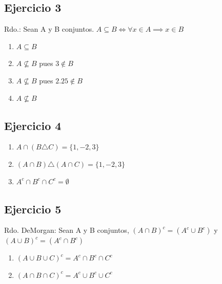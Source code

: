 \subsection{Ejercicio 3}
Rdo.: Sean A y B conjuntos. $ A \subseteq B \iff \forall x \in A \implies x \in B$
\begin{enumerate}[label=(\alph*)]
    \item $A \subseteq B$
    \item $A \not \subseteq B$ pues $3 \not \in B$
    \item $A \not \subseteq B$ pues $2.25 \not \in B$
    \item $A \not \subseteq B$
\end{enumerate}

\subsection{Ejercicio 4}
\begin{enumerate}[label=(\alph*)]
    \item $A \cap (B \triangle C) = \{ 1,-2,3 \}$
    \item $(A \cap B) \triangle (A \cap C) = \{1,-2,3\}$
    \item $A^c \cap B^c \cap C^c = \emptyset$ 
\end{enumerate}

\subsection{Ejercicio 5}
Rdo. DeMorgan: Sean A y B conjuntos, $(A \cap B)^c = (A^c \cup B^c)$ y $(A \cup B)^c = (A^c \cap B^c)$

\begin{enumerate}
    \item $(A \cup B \cup C)^c = A^c \cap B^c \cap C^c$
    \item $(A \cap B \cap C)^c = A^c \cup B^c \cup C^c$
\end{enumerate}

